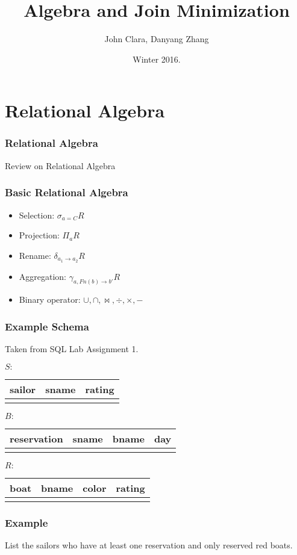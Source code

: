 \documentclass{beamer}
\begin{document}
\title{Algebra and Join Minimization}
\author{John Clara, Danyang Zhang}
\date[WI 2016]{Winter 2016.}

\subject{Algebra and Join Minimization}

\begin{frame}
  \titlepage
\end{frame}
\section{Relational Algebra}

\begin{frame}
  \frametitle{Relational Algebra}
 Review on Relational Algebra
\end{frame}

\begin{frame}
  \frametitle{Basic Relational Algebra}
  \begin{itemize}
  \item Selection: $\sigma_{a=C} R$
  \item Projection: $\Pi_{a}R$
  \item Rename: $\delta_{a_1 \rightarrow a_2}R$
  \item Aggregation: $\gamma_{a, Fn(b)\rightarrow b'}R$
  \item Binary operator: $\cup, \cap, \bowtie, \div, \times, -$
  \end{itemize}
\end{frame}
\begin{frame}
\frametitle{Example Schema}
Taken from SQL Lab Assignment 1.

$S: $
\begin{tabular}{c|cc}
  sailor & sname & rating \\
  \hline
  \\
\end{tabular}

$B: $
\begin{tabular}{c|ccc}
  reservation & sname & bname & day\\
  \hline
  \\
\end{tabular}

$R:$
\begin{tabular}{c|ccc}
  boat & bname  & color & rating \\
  \hline
  \\
\end{tabular}
\end{frame}
\begin{frame}
\frametitle{Example}
List the sailors who have at least one reservation and only reserved red boats.  
\end{frame}
\end{document}

